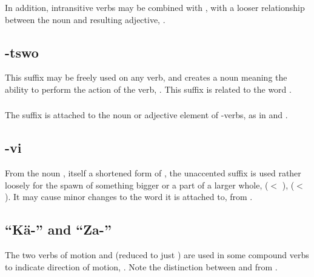 \subsubsection{} In addition, intransitive verbs may
be combined with , with a looser relationship between the
noun and resulting adjective, 
  .

\subsection{-tswo} This suffix may be freely used on any verb, and
creates a noun meaning the ability to perform the action of the verb,
   .
This suffix is related to the word  .

\subsubsection{} The suffix  is attached to the noun or
adjective element of -verbs, as in   and  .

\subsection{-vi} From the noun , itself a shortened form of
 , the unaccented suffix  is used rather
loosely for the spawn of something bigger or a part of a larger whole,
  ($<$  ), 
 ($<$  ).  It may
cause minor changes to the word it is attached to, 
 from  .

\subsection{``Kä-'' and ``Za-''} The two verbs of motion  
and   (reduced to just ) are used in some
compound verbs to indicate direction of motion, 
.  Note the distinction between  
and   from  .


